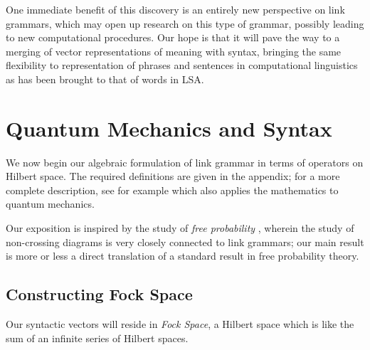 \documentclass[12pt]{report}
\begin{document}
One immediate benefit of this discovery is an entirely new perspective on link grammars, which may open up research on this type of grammar, possibly leading to new computational procedures. Our hope is that it will pave the way to a merging of vector representations of meaning with syntax, bringing the same flexibility to representation of phrases and sentences in computational linguistics as has been brought to that of words in LSA.




\section{Quantum Mechanics and Syntax}

We now begin our algebraic formulation of link grammar in terms of operators on Hilbert space. The required definitions are given in the appendix; for a more complete description, see for example \cite{Kreyszig:89} which also applies the mathematics to quantum mechanics.


Our exposition is inspired by the study of \emph{free probability} \cite{Voiculescu:97}, wherein the study of non-crossing diagrams is very closely connected to link grammars; our main result is more or less a direct translation of a standard result in free probability theory.

\subsection{Constructing Fock Space}

Our syntactic vectors will reside in \emph{Fock Space}, a Hilbert space which is like the sum of an infinite series of Hilbert spaces.
\end{document}
